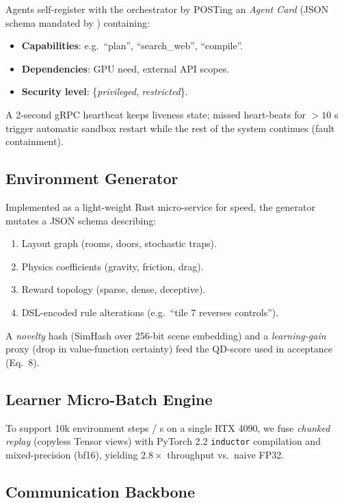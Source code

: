 Agents self-register with the orchestrator by POSTing an \emph{Agent Card}
(JSON schema mandated by \cite{a2a2023}) containing:

\begin{itemize}
  \item \textbf{Capabilities}: e.g.\ ``plan'', ``search\_web'', ``compile''.
  \item \textbf{Dependencies}: GPU need, external API scopes.
  \item \textbf{Security level}: \{\textit{privileged}, \textit{restricted}\}.
\end{itemize}

A 2-second gRPC heartbeat keeps liveness state; missed heart-beats for
$>10$ s trigger automatic sandbox restart while the rest of the system
continues (fault containment).

\subsection{Environment Generator}

Implemented as a light-weight Rust micro-service for speed, the generator
mutates a JSON schema describing:

\begin{enumerate}[label=\alph*)]
  \item Layout graph (rooms, doors, stochastic traps).
  \item Physics coefficients (gravity, friction, drag).
  \item Reward topology (sparse, dense, deceptive).
  \item DSL-encoded rule alterations (e.g.\ ``tile 7 reverses controls'').
\end{enumerate}

A \emph{novelty} hash (SimHash over 256-bit scene embedding) and a
\emph{learning-gain} proxy (drop in value-function certainty) feed the
QD-score used in acceptance (Eq.~8).

\subsection{Learner Micro-Batch Engine}

To support 10k environment steps / s on a single RTX 4090, we fuse
\emph{chunked replay} (copyless Tensor views) with PyTorch 2.2
\texttt{inductor} compilation and mixed-precision (bf16), yielding
$2.8\times$ throughput vs.\ naive FP32.

\subsection{Communication Backbone}

